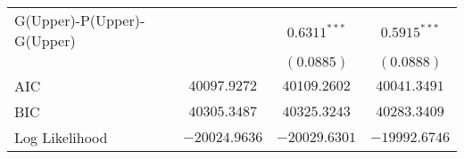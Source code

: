 \begin{center}
\begin{longtable}{l c c c}
G(Upper)-P(Upper)-G(Upper)                &                 & $0.6311^{***}$ & $0.5915^{***}$  \\
                                          &                 & $(0.0885)$     & $(0.0888)$      \\
\midrule
AIC                                       & $40097.9272$    & $40109.2602$   & $40041.3491$    \\
BIC                                       & $40305.3487$    & $40325.3243$   & $40283.3409$    \\
Log Likelihood                            & $-20024.9636$   & $-20029.6301$  & $-19992.6746$   \\
\end{longtable}
\end{center}
